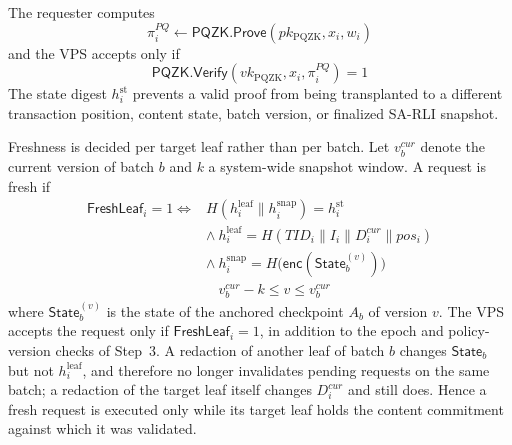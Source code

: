 \documentclass[lettersize,journal]{IEEEtran}
\begin{document}
The requester computes
\begin{equation}
\pi_i^{PQ}\leftarrow
\mathsf{PQZK.Prove}
(pk_{\mathrm{PQZK}},x_i,w_i)
\end{equation}
and the VPS accepts only if
\begin{equation}
\mathsf{PQZK.Verify}
(vk_{\mathrm{PQZK}},x_i,\pi_i^{PQ})=1
\label{eq:pqzk_verify}
\end{equation}
The state digest $h_i^{\mathrm{st}}$ prevents a valid proof from being
transplanted to a different transaction position, content state, batch
version, or finalized SA-RLI snapshot.

Freshness is decided per target leaf rather than per
batch. Let $v_b^{cur}$ denote the current version of batch $b$ and $k$ a
system-wide snapshot window. A request is fresh if
\begin{equation}
\begin{aligned}
\mathsf{FreshLeaf}_i=1
\iff{}&
H(h_i^{\mathrm{leaf}}\parallel h_i^{\mathrm{snap}})=h_i^{\mathrm{st}}\\
&\land\
h_i^{\mathrm{leaf}}=H(TID_i\parallel I_i\parallel D_i^{cur}\parallel pos_i)\\
&\land\
h_i^{\mathrm{snap}}=H\big(\mathsf{enc}(\mathsf{State}_b^{(v)})\big)\\
&\phantom{\land\ }
v_b^{cur}-k\le v\le v_b^{cur}
\end{aligned}
\label{eq:freshleaf}
\end{equation}
where $\mathsf{State}_b^{(v)}$ is the state of the
anchored checkpoint $A_b$ of version $v$. The VPS accepts the request only
if $\mathsf{FreshLeaf}_i=1$, in addition to the epoch and policy-version
checks of Step~3. A redaction of another leaf of batch $b$ changes
$\mathsf{State}_b$ but not $h_i^{\mathrm{leaf}}$, and therefore no longer
invalidates pending requests on the same batch; a redaction of the target
leaf itself changes $D_i^{cur}$ and still does. Hence a fresh request is
executed only while its target leaf holds the content commitment against
which it was validated.
\end{document}
